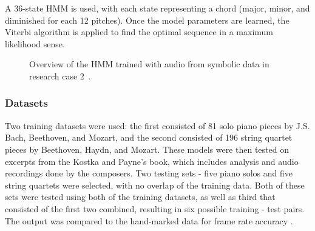 \documentclass{sig-alternate}
\begin{document}
A 36-state HMM is used, with each state representing a chord (major, minor, and diminished for each 12 pitches). Once the model parameters are learned, the Viterbi algorithm is applied to find the optimal sequence in a maximum likelihood sense. 




\begin{figure}
\centering
{}
\caption{Overview of the HMM trained with audio from symbolic data in research case 2~\cite{Lee:2006}.}
\label{fig:fig1}
\end{figure}

\subsubsection{Datasets}

Two training datasets were used: the first consisted of 81 solo piano pieces by J.S. Bach, Beethoven, and Mozart, and the second consisted of 196 string quartet pieces by Beethoven, Haydn, and Mozart. These models were then tested on excerpts from the Kostka and Payne's book, which includes analysis and audio recordings done by the composers. Two testing sets - five piano solos and five string quartets were selected, with no overlap of the training data. Both of these sets were tested using both of the training datasets, as well as third that consisted of the first two combined, resulting in six possible training - test pairs. The output was compared to the hand-marked data for frame rate accuracy \cite{Lee:2006}. 
\end{document}
